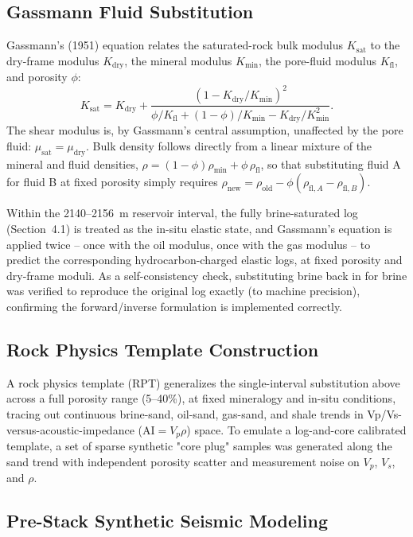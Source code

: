 \documentclass[11pt]{article}
\begin{document}
\subsection{Gassmann Fluid Substitution}

Gassmann's (1951) equation relates the saturated-rock bulk modulus \(K_\mathrm{sat}\) to the dry-frame modulus \(K_\mathrm{dry}\), the mineral modulus \(K_\mathrm{min}\), the pore-fluid modulus \(K_\mathrm{fl}\), and porosity \(\phi\):
\[
K_\mathrm{sat} = K_\mathrm{dry} + \frac{\left(1 - K_\mathrm{dry}/K_\mathrm{min}\right)^2}{\phi/K_\mathrm{fl} + (1-\phi)/K_\mathrm{min} - K_\mathrm{dry}/K_\mathrm{min}^2}.
\]
The shear modulus is, by Gassmann's central assumption, unaffected by the pore fluid: \(\mu_\mathrm{sat}=\mu_\mathrm{dry}\). Bulk density follows directly from a linear mixture of the mineral and fluid densities, \(\rho = (1-\phi)\rho_\mathrm{min} + \phi\,\rho_\mathrm{fl}\), so that substituting fluid A for fluid B at fixed porosity simply requires \(\rho_\mathrm{new} = \rho_\mathrm{old} - \phi(\rho_{\mathrm{fl},A}-\rho_{\mathrm{fl},B})\).

Within the 2140--2156~m reservoir interval, the fully brine-saturated log (Section~4.1) is treated as the in-situ elastic state, and Gassmann's equation is applied twice -- once with the oil modulus, once with the gas modulus -- to predict the corresponding hydrocarbon-charged elastic logs, at fixed porosity and dry-frame moduli. As a self-consistency check, substituting brine back in for brine was verified to reproduce the original log exactly (to machine precision), confirming the forward/inverse formulation is implemented correctly.

\subsection{Rock Physics Template Construction}

A rock physics template (RPT) generalizes the single-interval substitution above across a full porosity range (5--40\%), at fixed mineralogy and in-situ conditions, tracing out continuous brine-sand, oil-sand, gas-sand, and shale trends in Vp/Vs-versus-acoustic-impedance (\(\mathrm{AI}=V_p\rho\)) space. To emulate a log-and-core calibrated template, a set of sparse synthetic "core plug" samples was generated along the sand trend with independent porosity scatter and measurement noise on \(V_p\), \(V_s\), and \(\rho\).

\subsection{Pre-Stack Synthetic Seismic Modeling}
\end{document}
